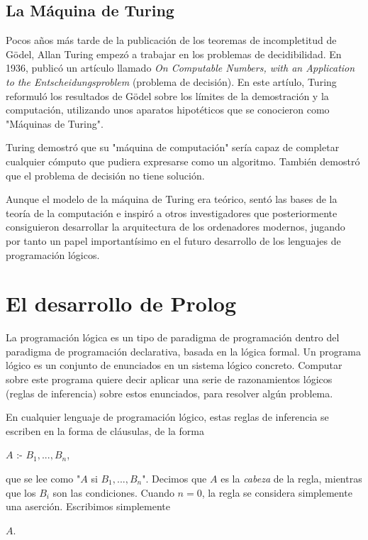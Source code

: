 \documentclass{article}
\begin{document}
\subsection{La Máquina de Turing}

Pocos años más tarde de la publicación de los teoremas de incompletitud de Gödel, Allan Turing empezó a trabajar en los problemas de decidibilidad. En 1936, publicó un artículo llamado \textit{On Computable Numbers, with an Application to the Entscheidungsproblem} (problema de decisión). En este artíulo, Turing reformuló los resultados de Gödel sobre los límites de la demostración y la computación, utilizando unos aparatos hipotéticos que se conocieron como "Máquinas de Turing".

Turing demostró que su "máquina de computación" sería capaz de completar cualquier cómputo que pudiera expresarse como un algoritmo. También demostró que el problema de decisión no tiene solución\cite{wigderson2019mathematics}.

Aunque el modelo de la máquina de Turing era teórico, sentó las bases de la teoría de la computación e inspiró a otros investigadores que posteriormente consiguieron desarrollar la arquitectura de los ordenadores modernos, jugando por tanto un papel importantísimo en el futuro desarrollo de los lenguajes de programación lógicos.

\section{El desarrollo de Prolog}

La programación lógica es un tipo de paradigma de programación dentro del paradigma de programación declarativa, basada en la lógica formal. Un programa lógico es un conjunto de enunciados en un sistema lógico concreto. Computar sobre este programa quiere decir aplicar una serie de razonamientos lógicos (reglas de inferencia) sobre estos enunciados, para resolver algún problema.

En cualquier lenguaje de programación lógico, estas reglas de inferencia se escriben en la forma de cláusulas, de la forma

\begin{displayquote}
    $A$ :- $B_1 , ..., B_n$,
\end{displayquote}

que se lee como "$A$ si $B_1 , ..., B_n$". Decimos que $A$ es la \textit{cabeza} de la regla, mientras que los $B_i$ son las condiciones. Cuando $n=0$, la regla se considera simplemente una aserción. Escribimos simplemente

\begin{displayquote}
    $A$.
\end{displayquote}



\renewcommand{\refname}{Referencias}


\end{document}
